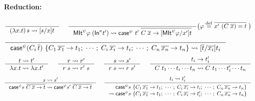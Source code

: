 \begin{figure}
\begin{framed}
\paragraph{Reduction:} 
\[ \inference{}{(\lambda x.t)\,s \rightsquigarrow [s/x]t}
 ~~~~
   \inference{}
      { \MIt^\psi \varphi\;(\In^\kappa t') \rightsquigarrow
        \case^\psi~t'~\overline{C\;\overline{x} -> [\MIt^\psi \varphi/x']t} }
      \big( \varphi \defeq \overline{x' ~ (C\;\overline{x}) = t}\; \big)
\]
\[ \inference{}
             {\case^\psi (C_i\,\overline{t}) ~
                \{C_1\,\overline{x_1} -> t_1;\;\cdots;\;
                  C_i\,\overline{x_i} -> t_i;\;\cdots;\;
                  C_n\,\overline{x_n} -> t_n \}
              \rightsquigarrow
              [\overline{t}/\overline{x_i}]t_i }
\]
\[  \inference{t \rightsquigarrow t'}{\lambda x.t \rightsquigarrow \lambda x.t'}
 ~~~~
   \inference{r \rightsquigarrow r'}{r\;s \rightsquigarrow r'\;s}
 ~~~~
   \inference{s \rightsquigarrow s'}{r\;s \rightsquigarrow r\;s'}
 ~~~~
   \inference{t_i \to t_i'}
             {C~t_1\cdots t_i \cdots t_n \rightsquigarrow
              C~t_1\cdots t_i'\cdots t_n }
\]
\[ \inference{s \rightsquigarrow s'}
             {\case^\psi s ~\overline{C\;\overline{x} -> t} \rightsquigarrow
              \case^\psi s'~\overline{C\;\overline{x} -> t} }
 ~~~~
   \inference{t_i \rightsquigarrow t_i' }
             {\begin{matrix}
             \phantom{\rightsquigarrow'}
              \case^\psi s ~
                \{C_1\,\overline{x_1} -> t_1;\;\cdots;\;
                  C_i\,\overline{x_i} -> t_i;\;\cdots;\;
                  C_n\,\overline{x_n} -> t_n \} \\
             \rightsquigarrow
              \case^\psi s ~
                \{C_1\,\overline{x_1} -> t_1;\;\cdots;\;
                  C_i\,\overline{x_i} -> t_i';\;\cdots;\;
                  C_n\,\overline{x_n} -> t_n \} \end{matrix} }
\]


\end{framed}
\end{figure}
